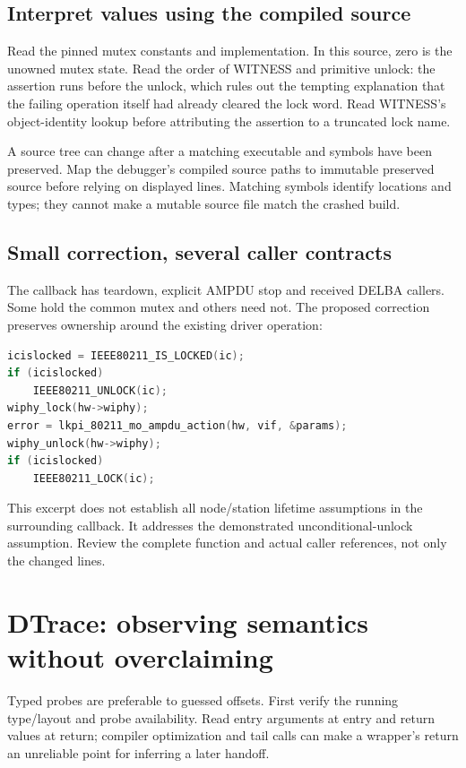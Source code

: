 \documentclass[11pt,letterpaper,oneside]{article}
\begin{document}
\subsection{Interpret values using the compiled source}
Read the pinned mutex constants and implementation. In this source, zero is the unowned mutex state. Read the order of WITNESS and primitive unlock: the assertion runs before the unlock, which rules out the tempting explanation that the failing operation itself had already cleared the lock word. Read WITNESS's object-identity lookup before attributing the assertion to a truncated lock name.

A source tree can change after a matching executable and symbols have been preserved. Map the debugger's compiled source paths to immutable preserved source before relying on displayed lines. Matching symbols identify locations and types; they cannot make a mutable source file match the crashed build.

\subsection{Small correction, several caller contracts}
The callback has teardown, explicit AMPDU stop and received DELBA callers. Some hold the common mutex and others need not. The proposed correction preserves ownership around the existing driver operation:

\begin{lstlisting}[language=C,caption={Candidate ownership preservation around an existing driver call.}]
icislocked = IEEE80211_IS_LOCKED(ic);
if (icislocked)
    IEEE80211_UNLOCK(ic);
wiphy_lock(hw->wiphy);
error = lkpi_80211_mo_ampdu_action(hw, vif, &params);
wiphy_unlock(hw->wiphy);
if (icislocked)
    IEEE80211_LOCK(ic);
\end{lstlisting}
This excerpt does not establish all node/station lifetime assumptions in the surrounding callback. It addresses the demonstrated unconditional-unlock assumption. Review the complete function and actual caller references, not only the changed lines.

\section{DTrace: observing semantics without overclaiming}
Typed probes are preferable to guessed offsets. First verify the running type/layout and probe availability. Read entry arguments at entry and return values at return; compiler optimization and tail calls can make a wrapper's return an unreliable point for inferring a later handoff.
\end{document}
